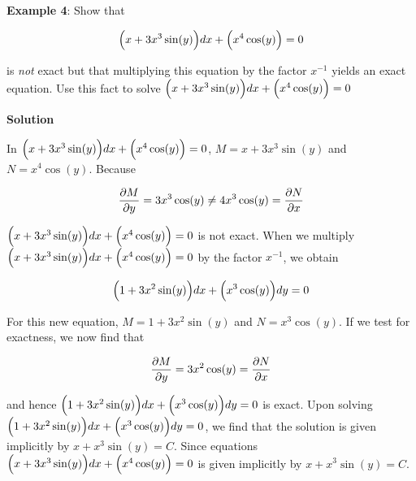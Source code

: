 \nopagenumbers
{\bf Example 4}: Show that

$$\Bigl(x+3x^3\sin(y)\Bigr)dx+\Bigl(x^4\cos(y)\Bigr)=0$$

is {\it not} exact but that multiplying this equation by the factor $x^{-1}$ yields an exact equation. Use this fact to solve $\Bigl(x+3x^3\sin(y)\Bigr)dx+\Bigl(x^4\cos(y)\Bigr)=0$

\vskip 10pt
{\bf Solution}

\vskip 6pt
In $\Bigl(x+3x^3\sin(y)\Bigr)dx+\Bigl(x^4\cos(y)\Bigr)=0$, $M=x+3x^3\sin(y)$ and $N=x^4\cos(y)$. Because

$${\partial M\over\partial y}=3x^3\cos(y)\neq 4x^3\cos(y)={\partial N\over\partial x}$$

$\Bigl(x+3x^3\sin(y)\Bigr)dx+\Bigl(x^4\cos(y)\Bigr)=0$ is not exact. When we multiply $\Bigl(x+3x^3\sin(y)\Bigr)dx+\Bigl(x^4\cos(y)\Bigr)=0$ by the factor $x^{-1}$, we obtain

$$\Bigl(1+3x^2\sin(y)\Bigr)dx+\Bigl(x^3\cos(y)\Bigr)dy=0$$

For this new equation, $M=1+3x^2\sin(y)$ and $N=x^3\cos(y)$. If we test for exactness, we now find that

$${\partial M\over\partial y}=3x^2\cos(y)={\partial N\over\partial x}$$

and hence $\Bigl(1+3x^2\sin(y)\Bigr)dx+\Bigl(x^3\cos(y)\Bigr)dy=0$ is exact. Upon solving $\Bigl(1+3x^2\sin(y)\Bigr)dx+\Bigl(x^3\cos(y)\Bigr)dy=0$, we find that the solution is given implicitly by $x+x^3\sin(y)=C$. Since equations $\Bigl(x+3x^3\sin(y)\Bigr)dx+\Bigl(x^4\cos(y)\Bigr)=0$ is given implicitly by $x+x^3\sin(y)=C$.

\vfill\eject
\bye
